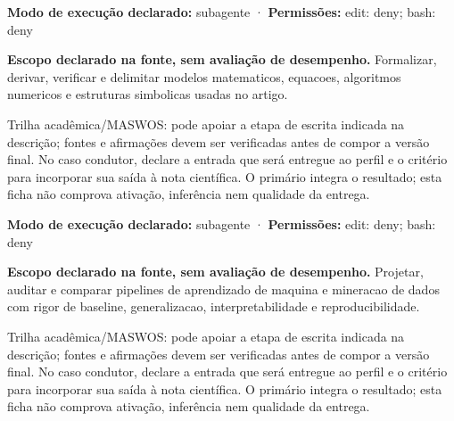 \begin{arquitetura}
\textbf{Modo de execução declarado:} subagente · \textbf{Permissões:} edit: deny; bash: deny
\end{arquitetura}


\begin{descricao}
\textbf{Escopo declarado na fonte, sem avaliação de desempenho.}
Formalizar, derivar, verificar e delimitar modelos matematicos, equacoes, algoritmos numericos e estruturas simbolicas usadas no artigo.
\end{descricao}

\begin{funcao}
Trilha acadêmica/MASWOS: pode apoiar a etapa de escrita indicada na descrição; fontes e afirmações devem ser verificadas antes de compor a versão final. No caso condutor, declare a entrada que será entregue ao perfil e o critério para incorporar sua saída à nota científica. O primário integra o resultado; esta ficha não comprova ativação, inferência nem qualidade da entrega.
\end{funcao}

\begin{arquitetura}
\textbf{Modo de execução declarado:} subagente · \textbf{Permissões:} edit: deny; bash: deny
\end{arquitetura}


\begin{descricao}
\textbf{Escopo declarado na fonte, sem avaliação de desempenho.}
Projetar, auditar e comparar pipelines de aprendizado de maquina e mineracao de dados com rigor de baseline, generalizacao, interpretabilidade e reproducibilidade.
\end{descricao}

\begin{funcao}
Trilha acadêmica/MASWOS: pode apoiar a etapa de escrita indicada na descrição; fontes e afirmações devem ser verificadas antes de compor a versão final. No caso condutor, declare a entrada que será entregue ao perfil e o critério para incorporar sua saída à nota científica. O primário integra o resultado; esta ficha não comprova ativação, inferência nem qualidade da entrega.
\end{funcao}

